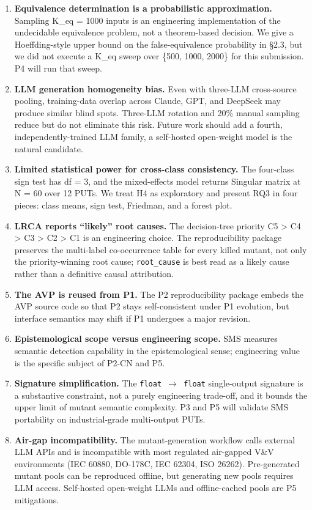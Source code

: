 \documentclass[review,12pt,authoryear]{elsarticle}
\begin{document}
\begin{enumerate}
\def\labelenumi{(\arabic{enumi})}
\item
  \textbf{Equivalence determination is a probabilistic approximation.}
  Sampling K\_eq = 1000 inputs is an engineering implementation of the
  undecidable equivalence problem, not a theorem-based decision. We give
  a Hoeffding-style upper bound on the false-equivalence probability in
  §2.3, but we did not execute a K\_eq sweep over \{500, 1000, 2000\}
  for this submission. P4 will run that sweep.
\item
  \textbf{LLM generation homogeneity bias.} Even with three-LLM
  cross-source pooling, training-data overlap across Claude, GPT, and
  DeepSeek may produce similar blind spots. Three-LLM rotation and 20\%
  manual sampling reduce but do not eliminate this risk. Future work
  should add a fourth, independently-trained LLM family, a self-hosted
  open-weight model is the natural candidate.
\item
  \textbf{Limited statistical power for cross-class consistency.} The
  four-class sign test has df = 3, and the mixed-effects model returns
  Singular matrix at N = 60 over 12 PUTs. We treat H4 as exploratory and
  present RQ3 in four pieces: class means, sign test, Friedman, and a
  forest plot.
\item
  \textbf{LRCA reports ``likely'' root causes.} The decision-tree
  priority C5 \textgreater{} C4 \textgreater{} C3 \textgreater{} C2
  \textgreater{} C1 is an engineering choice. The reproducibility
  package preserves the multi-label co-occurrence table for every killed
  mutant, not only the priority-winning root cause; \texttt{root\_cause}
  is best read as a likely cause rather than a definitive causal
  attribution.
\item
  \textbf{The AVP is reused from P1.} The P2 reproducibility package
  embeds the AVP source code so that P2 stays self-consistent under P1
  evolution, but interface semantics may shift if P1 undergoes a major
  revision.
\item
  \textbf{Epistemological scope versus engineering scope.} SMS measures
  semantic detection capability in the epistemological sense;
  engineering value is the specific subject of P2-CN and P5.
\item
  \textbf{Signature simplification.} The \texttt{float\ $\to$\ float}
  single-output signature is a substantive constraint, not a purely
  engineering trade-off, and it bounds the upper limit of mutant
  semantic complexity. P3 and P5 will validate SMS portability on
  industrial-grade multi-output PUTs.
\item
  \textbf{Air-gap incompatibility.} The mutant-generation workflow calls
  external LLM APIs and is incompatible with most regulated air-gapped
  V\&V environments (IEC 60880, DO-178C, IEC 62304, ISO 26262).
  Pre-generated mutant pools can be reproduced offline, but generating
  new pools requires LLM access. Self-hosted open-weight LLMs and
  offline-cached pools are P5 mitigations.
\end{enumerate}
\end{document}
